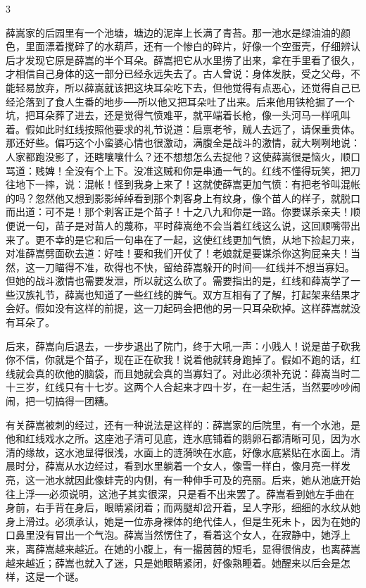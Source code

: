 3 

薛嵩家的后园里有一个池塘，塘边的泥岸上长满了青苔。那一池水是绿油油的颜色，里面漂着搅碎了的水葫芦，还有一个惨白的碎片，好像一个空蛋壳，仔细辨认后才发现它原是薛嵩的半个耳朵。薛嵩把它从水里捞了出来，拿在手里看了很久，才相信自己身体的这一部分已经永远失去了。古人曾说：身体发肤，受之父母，不能轻易放弃，所以薛嵩就该把这块耳朵吃下去，但他觉得有点恶心，还觉得自己已经沦落到了食人生番的地步──所以他又把耳朵吐了出来。后来他用铁枪掘了一个坑，把耳朵葬了进去，还是觉得气愤难平，就平端着长枪，像一头河马一样吼叫着。假如此时红线按照他要求的礼节说道：启禀老爷，贼人去远了，请保重贵体。那还好些。偏巧这个小蛮婆心情也很激动，满腹全是战斗的激情，就大咧咧地说：人家都跑没影了，还瞎嚷嚷什么？还不想想怎么去捉他？这使薛嵩很是恼火，顺口骂道：贱婢！全没有个上下。没准这贼和你是串通一气的。红线不懂得玩笑，把刀往地下一摔，说：混帐！怪到我身上来了！这就使薛嵩更加气愤：有把老爷叫混帐的吗？忽然他又想到影影绰绰看到那个刺客身上有纹身，像个苗人的样子，就脱口而出道：可不是！那个刺客正是个苗子！十之八九和你是一路。你要谋杀亲夫！顺便说一句，苗子是对苗人的蔑称，平时薛嵩绝不会当着红线这么说，这回顺嘴带出来了。更不幸的是它和后一句串在了一起，这使红线更加气愤，从地下捡起刀来，对准薛嵩劈面砍去道：好哇！要和我们开仗了！老娘就是要谋杀你这狗屁亲夫！当然，这一刀瞄得不准，砍得也不快，留给薛嵩躲开的时间──红线并不想当寡妇。但她的战斗激情也需要发泄，所以就这么砍了。需要指出的是，红线和薛嵩学了一些汉族礼节，薛嵩也知道了一些红线的脾气。双方互相有了了解，打起架来结果才会好。假如没有这样的前提，这一刀起码会把他的另一只耳朵砍掉。这样薛嵩就没有耳朵了。 

后来，薛嵩向后退去，一步步退出了院门，终于大吼一声：小贱人！说是苗子砍我你不信，你就是个苗子，现在正在砍我！说着他就转身跑掉了。假如不跑的话，红线就会真的砍他的脑袋，而且她就会真的当寡妇了。对此必须补充说：薛嵩当时二十三岁，红线只有十七岁。这两个人合起来才四十岁，在一起生活，当然要吵吵闹闹，把一切搞得一团糟。 

有关薛嵩被刺的经过，还有一种说法是这样的：薛嵩家的后院里，有一个水池，是他和红线戏水之所。这座池子清可见底，连水底铺着的鹅卵石都清晰可见，因为水清的缘故，这水池显得很浅，水面上的涟漪映在水底，好像水底紧贴在水面上。清晨时分，薛嵩从水边经过，看到水里躺着一个女人，像雪一样白，像月亮一样发亮，这一池水就因此像蚌壳的内侧，有一种伸手可及的亮丽。后来，她从池底开始往上浮──必须说明，这池子其实很深，只是看不出来罢了。薛嵩看到她左手曲在身前，右手背在身后，眼睛紧闭着；而两腿却岔开着，呈人字形，细细的水纹从她身上滑过。必须承认，她是一位赤身裸体的绝代佳人，但是生死未卜，因为在她的口鼻里没有冒出一个气泡。薛嵩当然愣住了，看着这个女人，在寂静中，她浮上来，离薛嵩越来越近。在她的小腹上，有一撮茵茵的短毛，显得很俏皮，也离薛嵩越来越近；薛嵩也就入了迷，只是她眼睛紧闭，好像熟睡着。她醒来以后会是怎样，这是一个谜。 

